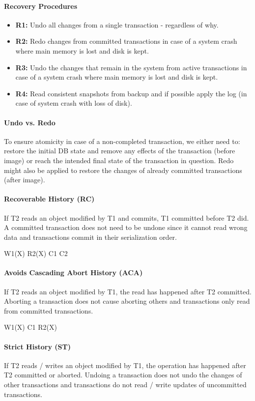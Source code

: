 \paragraph{Recovery Procedures}
\begin{itemize}
    \item \textbf{R1:} Undo all changes from a single transaction - regardless of why.
    \item \textbf{R2:} Redo changes from committed transactions in case of a system crash where main memory is lost and disk is kept.
    \item \textbf{R3:} Undo the changes that remain in the system from active transactions in case of a system crash where main memory is lost and disk is kept.
    \item \textbf{R4:} Read consistent snapshots from backup and if possible apply the log (in case of system crash with loss of disk).
\end{itemize}

\paragraph{Undo vs. Redo}
To ensure atomicity in case of a non-completed transaction, we either need to: restore the initial DB state and remove any effects of the transaction (before image) or reach the intended final state of the transaction in question. Redo might also be applied to restore the changes of already committed transactions (after image).

\paragraph{Recoverable History (RC)}
If T2 reads an object modified by T1 and commits, T1 committed before T2 did. A committed transaction does not need to be undone since it cannot read wrong data and transactions commit in their serialization order.

W1(X) R2(X) C1 C2

\paragraph{Avoids Cascading Abort History (ACA)}
If T2 reads an object modified by T1, the read has happened after T2 committed. Aborting a transaction does not cause aborting others and transactions only read from committed transactions.

W1(X) C1 R2(X)

\paragraph{Strict History (ST)}
If T2 reads / writes an object modified by T1, the operation has happened after T2 committed or aborted. Undoing a transaction does not undo the changes of other transactions and transactions do not read / write updates of uncommitted transactions.

